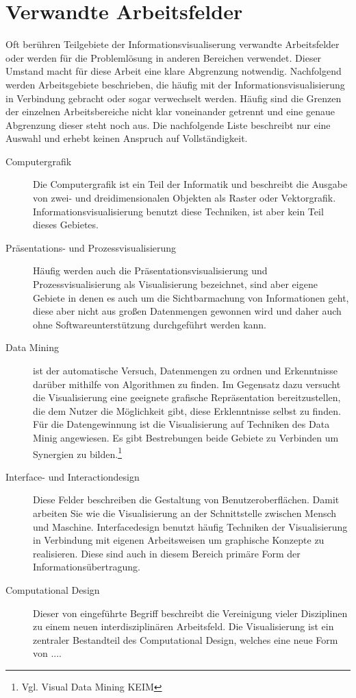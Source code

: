 \documentclass[a4paper, 12pt, DIVcalc, onepage, pdftex, headsepline, footsepline]{scrreprt}
\begin{document}
\section{Verwandte Arbeitsfelder}
\label{sec:Arbeitsfelder}
Oft berühren Teilgebiete der Informationsvisualiserung verwandte Arbeitsfelder oder werden für die Problemlösung
in anderen Bereichen verwendet. Dieser Umstand macht für diese Arbeit eine klare Abgrenzung notwendig.
Nachfolgend werden Arbeitsgebiete beschrieben, die häufig mit der Informationsvisualisierung in Verbindung
gebracht oder sogar verwechselt werden. Häufig sind die Grenzen der einzelnen Arbeitsbereiche nicht klar
voneinander getrennt und eine genaue Abgrenzung dieser steht noch aus. Die nachfolgende Liste beschreibt nur
eine Auswahl und erhebt keinen Anspruch auf Vollständigkeit.
\begin{description}
\item[Computergrafik]
Die Computergrafik ist ein Teil der Informatik und beschreibt die Ausgabe von zwei- und dreidimensionalen
Objekten als Raster oder Vektorgrafik. Informationsvisualisierung benutzt diese Techniken, ist aber kein Teil
dieses Gebietes.
\item[Präsentations- und Prozessvisualisierung]
Häufig werden auch die Präsentationsvisualisierung und Prozessvisualisierung als Visualisierung bezeichnet, sind
aber eigene Gebiete in denen es auch um die Sichtbarmachung von Informationen geht, diese aber nicht aus
großen Datenmengen gewonnen wird und daher auch ohne Softwareunterstützung durchgeführt werden kann.
\item[Data Mining] ist der automatische Versuch, Datenmengen zu ordnen und Erkenntnisse darüber mithilfe
von Algorithmen zu finden. Im Gegensatz dazu versucht die Visualisierung eine geeignete grafische Repräsentation
bereitzustellen, die dem Nutzer die Möglichkeit gibt, diese Erklenntnisse selbst zu finden. Für die Datengewinnung
ist die Visualisierung auf Techniken des Data Minig angewiesen. Es gibt Bestrebungen beide Gebiete zu
Verbinden um Synergien zu bilden.\footnote{Vgl. Visual Data Mining KEIM}
\item[Interface- und Interactiondesign]
Diese Felder beschreiben die Gestaltung von Benutzeroberflächen. Damit arbeiten Sie wie die Visualisierung an
der Schnittstelle zwischen Mensch und Maschine. Interfacedesign benutzt häufig Techniken der Visualisierung
in Verbindung mit eigenen Arbeitsweisen um graphische Konzepte zu realisieren. Diese sind auch in diesem
Bereich primäre Form der Informationsübertragung.
\item[Computational Design]
Dieser von \citep{BenFry} eingeführte Begriff beschreibt die Vereinigung vieler Disziplinen zu einem neuen
interdisziplinären Arbeitsfeld. Die Visualisierung ist ein zentraler Bestandteil des Computational Design,
welches eine neue Form von ....
\end{description}
\end{document}
